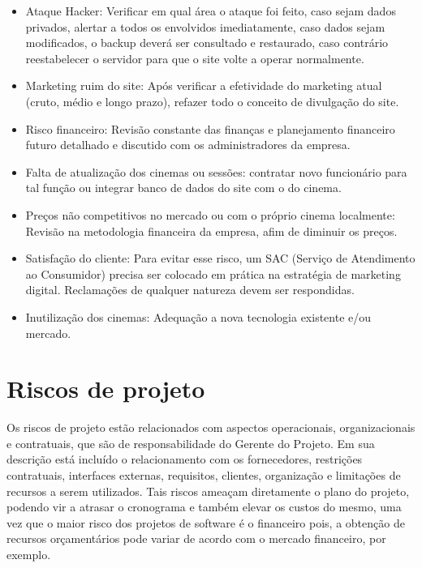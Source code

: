 \documentclass[12pt]{article}
\begin{document}
\begin{itemize}
        \item  Ataque Hacker: Verificar em qual área o ataque foi feito, caso sejam dados privados, alertar a todos os envolvidos imediatamente, caso dados sejam modificados, o backup deverá ser consultado e restaurado, caso contrário reestabelecer o servidor para que o site volte a operar normalmente.
        
        \item Marketing ruim do site: Após verificar a efetividade do marketing atual (cruto, médio e longo prazo), refazer todo o conceito de divulgação do site.
        
        \item Risco financeiro:  Revisão constante das finanças e planejamento financeiro futuro detalhado e discutido com os administradores da empresa.
        
        \item Falta de atualização dos cinemas ou sessões: contratar novo funcionário para tal função ou integrar banco de dados do site com o do cinema.
        
        \item Preços não competitivos no mercado ou com o próprio cinema localmente: Revisão na metodologia financeira da empresa, afim de diminuir os preços.
        
        \item Satisfação do cliente: Para evitar esse risco, um SAC (Serviço de Atendimento ao Consumidor) precisa ser colocado em prática na estratégia de marketing digital. Reclamações de qualquer natureza devem ser respondidas.
        
         \item Inutilização dos cinemas: Adequação a nova tecnologia existente e/ou mercado.
        
       \end{itemize}

    \section{Riscos de projeto}
        Os riscos de projeto estão relacionados com aspectos operacionais, organizacionais e contratuais, que são de responsabilidade do Gerente do Projeto. Em sua descrição está incluído o relacionamento com os fornecedores, restrições contratuais, interfaces externas, requisitos, clientes, organização e limitações de recursos a serem utilizados. Tais riscos ameaçam diretamente o plano do projeto, podendo vir a atrasar o cronograma e também elevar os custos do mesmo, uma vez que o maior risco dos projetos de software é o financeiro pois, a obtenção de recursos orçamentários pode variar de acordo com o mercado financeiro, por exemplo.
\end{document}
